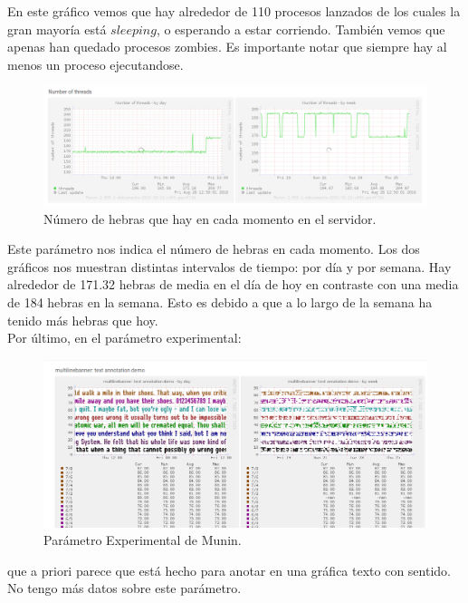 \begin{itemize}
	En este gráfico vemos que hay alrededor de 110 procesos lanzados de los cuales la gran mayoría está $sleeping$, o esperando a estar corriendo. También vemos que apenas han quedado procesos zombies. Es importante notar que siempre hay al menos un proceso ejecutandose.\\
	
	\begin{figure}[H]
		\centering
		\includegraphics[width=0.7\linewidth]{MuninHebras}
		\caption[HebrasMunin]{Número de hebras que hay en cada momento en el servidor.}
		\label{fig:MuninHebras}
	\end{figure}

	Este parámetro nos indica el número de hebras en cada momento. Los dos gráficos nos muestran distintas intervalos de tiempo: por día y por semana. Hay alrededor de 171.32 hebras de media en el día de hoy en contraste con una media de 184 hebras en la semana. Esto es debido a que a lo largo de la semana ha tenido más hebras que hoy.\\
	
	Por último, en el parámetro experimental:\\
	
	\begin{figure}[H]
		\centering
		\includegraphics[width=0.7\linewidth]{MuninExperimental}
		\caption[MuninExperimental]{Parámetro Experimental de Munin.}
		\label{fig:MuninExperimental}
	\end{figure}
	
	que a priori parece que está hecho para anotar en una gráfica texto con sentido. No tengo más datos sobre este parámetro.
	
	
\end{itemize}
